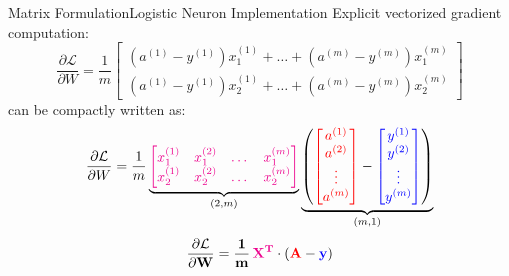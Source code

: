\documentclass[aspectratio=169]{beamer}
\begin{document}
\begin{frame}{Matrix Formulation}{Logistic Neuron Implementation}
Explicit vectorized gradient computation:
\[\frac{\partial \mathcal{L}}{\partial W} = 
\frac{1}{m}
\begin{bmatrix}
(a^{(1)} - y^{(1)})x_1^{(1)} + \dots + (a^{(m)} - y^{(m)})x_1^{(m)} \\
(a^{(1)} - y^{(1)})x_2^{(1)} + \dots + (a^{(m)} - y^{(m)})x_2^{(m)}
\end{bmatrix}
\]
can be compactly written as:
\[\frac{\partial \mathcal{L}}{\partial W} = \frac{1}{m}
\underbrace{
\textcolor{magenta}{
\begin{bmatrix}
x_1^{(1)} & x_1^{(2)} & \dots & x_1^{(m)} \\
x_2^{(1)} & x_2^{(2)} & \dots & x_2^{(m)}
\end{bmatrix}}}_{(2,m)}
\underbrace{
\left(
\textcolor{red}{
\begin{bmatrix}a^{(1)} \\ a^{(2)} \\ \vdots \\ a^{(m)}\end{bmatrix}}-
\textcolor{blue}{
\begin{bmatrix}y^{(1)} \\ y^{(2)} \\ \vdots \\ y^{(m)}\end{bmatrix}}
\right)}_{(m,1)}
\]
\[\mathbf{
\frac{\partial \mathcal{L}}{\partial W} = \frac{1}{m}
\textcolor{magenta}{\, X^T} \cdot \left( \textcolor{red} A - \textcolor{blue}y \right)
}
\]
\end{frame}
%
%
\end{document}
